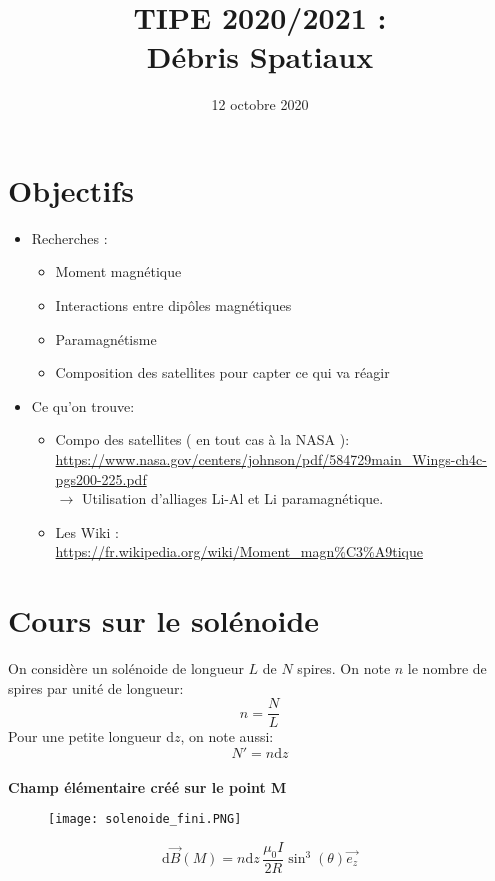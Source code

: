 \documentclass[a4paper,1pt]{article}
\title{TIPE 2020/2021 : \\ Débris Spatiaux}
\date{12 octobre 2020}
\begin{document}
\maketitle

\section*{Objectifs}
\begin{itemize}
    \item Recherches : 
    \begin{itemize}
        \item Moment magnétique
        \item Interactions entre dipôles magnétiques
        \item Paramagnétisme
        \item Composition des satellites pour capter ce qui va réagir
    \end{itemize}
    \item Ce qu'on trouve:
    \begin{itemize}
        \item  Compo des satellites ( en tout cas à la NASA ):\\
        \url{https://www.nasa.gov/centers/johnson/pdf/584729main_Wings-ch4c-pgs200-225.pdf}\\
        $\rightarrow$ Utilisation d'alliages Li-Al et Li paramagnétique.
        \item Les Wiki :\\
        \url{https://fr.wikipedia.org/wiki/Moment_magn%C3%A9tique}
    \end{itemize}
       
\end{itemize}

\section*{Cours sur le solénoide}
On considère un solénoide de longueur $L$ de $N$ spires. On note $n$ le nombre de spires par unité de longueur:
$$n= \frac{N}{L}$$
Pour une petite longueur d$z$, on note aussi:
$$N'=n\mathrm{d}z$$
\\
\textbf{Champ élémentaire créé sur le point M}
\begin{figure}[h]
    \texttt{[image: solenoide\_fini.PNG]}
\end{figure}

$$\mathrm{d} \overset{\to}{B}(M) = n\mathrm{d}z\, \frac{\mu_0 I}{2 R} \sin^3(\theta) \overset{\to}{e_z}$$
\end{document}
